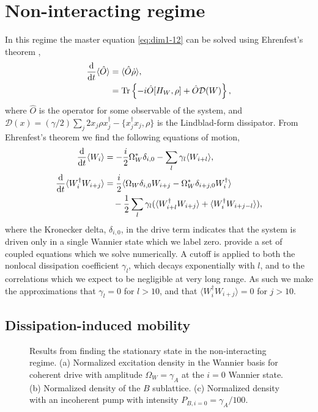 \section{Non-interacting regime}
In this regime the master equation \cref{eq:dim1-12} can be solved using Ehrenfest's theorem \cite{Ehrenfest1927,BP_Ehrenfest},
\begin{align}
	\frac{\mathrm{d}}{\mathrm{d}t} \langle \hat{O} \rangle &= \langle \hat{O} \dot{\rho} \rangle, \notag \\
	&= \mathrm{Tr}\left\{ -i\hat{O}[H_{W}, \rho] + \hat{O}\mathcal{D}(W) \right\},
	\label{eq:dim2-1}
\end{align}
where \(\hat{O}\) is the operator for some observable of the system, and \(\mathcal{D}(x)=(\gamma/2)\sum_{j}2x_{j}\rho x_{j}^{\dagger} - \{x_{j}^{\dagger}x_{j}, \rho\}\) is the Lindblad-form dissipator. From Ehrenfest's theorem we find the following equations of motion,
\begin{align}
	\frac{\mathrm{d}}{\mathrm{d}t} \langle W_{i} \rangle &= -\frac{i}{2}\Omega_{W}^{*}\delta_{i,0} - \sum_{l} \gamma_{l}\langle W_{i+l} \rangle, \label{eq:dim2-2} \\
	\frac{\mathrm{d}}{\mathrm{d}t} \langle W_{i}^{\dagger}W_{i+j} \rangle &= \frac{i}{2} \langle \Omega_{W}\delta_{i,0} W_{i+j} - \Omega_{W}^{*}\delta_{i+j,0}W_{i}^{\dagger} \rangle \notag \\
	&\quad - \frac{1}{2}\sum_{l} \gamma_{l} (\langle W_{i+l}^{\dagger}W_{i+j} \rangle + \langle W_{i}^{\dagger}W_{i+j-l}\rangle), \label{eq:dim2-3}
\end{align}
where the Kronecker delta, \(\delta_{i,0}\), in the drive term indicates that the system is driven only in a single Wannier state which we label zero.  provide a set of coupled equations which we solve numerically. A cutoff is applied to both the nonlocal dissipation coefficient \(\gamma_{l}\), which decays exponentially with \(l\), and to the correlations which we expect to be negligible at very long range. As such we make the approximations that \(\gamma_{l} = 0\) for \(l > 10\), and that \(\langle W_{i}^{\dagger}W_{i+j} \rangle = 0\) for \(j > 10\).

\subsection{Dissipation-induced mobility}

\begin{figure}[ht!]
\centering
{}%
%
\caption{Results from finding the stationary state in the non-interacting regime. (a) Normalized excitation density in the Wannier basis for coherent drive with amplitude \(\Omega_{W} = \gamma_{A}\) at the \(i=0\) Wannier state. (b) Normalized density of the \(B\) sublattice. (c) Normalized density with an incoherent pump with intensity \(P_{B,i=0} = \gamma_{A}/100\).}
\label{fig:dim2-1}
\end{figure}

